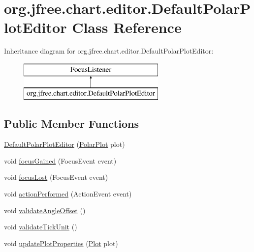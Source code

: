 \hypertarget{classorg_1_1jfree_1_1chart_1_1editor_1_1_default_polar_plot_editor}{}\section{org.\+jfree.\+chart.\+editor.\+Default\+Polar\+Plot\+Editor Class Reference}
\label{classorg_1_1jfree_1_1chart_1_1editor_1_1_default_polar_plot_editor}
Inheritance diagram for org.\+jfree.\+chart.\+editor.\+Default\+Polar\+Plot\+Editor\+:\begin{figure}[H]
\begin{center}
\leavevmode
\includegraphics[height=2.000000cm]{classorg_1_1jfree_1_1chart_1_1editor_1_1_default_polar_plot_editor}
\end{center}
\end{figure}
\subsection*{Public Member Functions}
\begin{DoxyCompactItemize}
\item 
\mbox{\hyperlink{classorg_1_1jfree_1_1chart_1_1editor_1_1_default_polar_plot_editor_a92ebc11554ea838e5afd4c43f7a63bcc}{Default\+Polar\+Plot\+Editor}} (\mbox{\hyperlink{classorg_1_1jfree_1_1chart_1_1plot_1_1_polar_plot}{Polar\+Plot}} plot)
\item 
void \mbox{\hyperlink{classorg_1_1jfree_1_1chart_1_1editor_1_1_default_polar_plot_editor_a2ab93483342ac22db896d17e7355e106}{focus\+Gained}} (Focus\+Event event)
\item 
void \mbox{\hyperlink{classorg_1_1jfree_1_1chart_1_1editor_1_1_default_polar_plot_editor_aec7856e7d34d0df22dd787151c8a58f5}{focus\+Lost}} (Focus\+Event event)
\item 
void \mbox{\hyperlink{classorg_1_1jfree_1_1chart_1_1editor_1_1_default_polar_plot_editor_a9a830375ece9f8765b75bb6a93aa0bd0}{action\+Performed}} (Action\+Event event)
\item 
void \mbox{\hyperlink{classorg_1_1jfree_1_1chart_1_1editor_1_1_default_polar_plot_editor_acf83aad23581b6dd04887fe6946029db}{validate\+Angle\+Offset}} ()
\item 
void \mbox{\hyperlink{classorg_1_1jfree_1_1chart_1_1editor_1_1_default_polar_plot_editor_a6abb94aa4eb93557fc23bb6a21c66854}{validate\+Tick\+Unit}} ()
\item 
void \mbox{\hyperlink{classorg_1_1jfree_1_1chart_1_1editor_1_1_default_polar_plot_editor_aadd1d80703419b435913bef3458780e9}{update\+Plot\+Properties}} (\mbox{\hyperlink{classorg_1_1jfree_1_1chart_1_1plot_1_1_plot}{Plot}} plot)
\end{DoxyCompactItemize}
